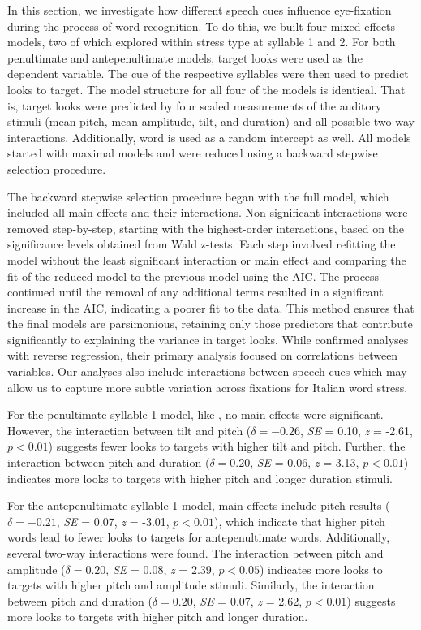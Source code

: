 In this section, we investigate how different speech cues influence eye-fixation during the process of word recognition. To do this, we built four mixed-effects models, two of which explored within stress type at syllable 1 and 2. For both penultimate and antepenultimate models, target looks were used as the dependent variable. The cue of the respective syllables were then used to predict looks to target. The model structure for all four of the models is identical. That is, target looks were predicted by four scaled measurements of the auditory stimuli (mean pitch, mean amplitude, tilt, and duration) and all possible two-way interactions. Additionally, word is used as a random intercept as well. All models started with maximal models and were reduced using a backward stepwise selection procedure. 

The backward stepwise selection procedure began with the full model, which included all main effects and their interactions. Non-significant interactions were removed step-by-step, starting with the highest-order interactions, based on the significance levels obtained from Wald z-tests. Each step involved refitting the model without the least significant interaction or main effect and comparing the fit of the reduced model to the previous model using the AIC. The process continued until the removal of any additional terms resulted in a significant increase in the AIC, indicating a poorer fit to the data. This method ensures that the final models are parsimonious, retaining only those predictors that contribute significantly to explaining the variance in target looks. While \cite{Sulpizio_McQueen_2012} confirmed analyses with reverse regression, their primary analysis focused on correlations between variables. Our analyses also include interactions between speech cues which may allow us to capture more subtle variation across fixations for Italian word stress.

For the penultimate syllable 1 model, like \cite{Sulpizio_McQueen_2012}, no main effects were significant. However, the interaction between tilt and pitch ($\delta = -0.26$, \textit{SE} = 0.10, \textit{z} = -2.61, $p < 0.01$) suggests fewer looks to targets with higher tilt and pitch. Further, the interaction between pitch and duration ($\delta = 0.20$, \textit{SE} = 0.06, \textit{z} = 3.13, $p < 0.01$) indicates more looks to targets with higher pitch and longer duration stimuli.

For the antepenultimate syllable 1 model, main effects include pitch results ($\delta = -0.21$, \textit{SE} = 0.07, \textit{z} = -3.01, $p < 0.01$), which indicate that higher pitch words lead to fewer looks to targets for antepenultimate words. Additionally, several two-way interactions were found. The interaction between pitch and amplitude ($\delta = 0.20$, \textit{SE} = 0.08, \textit{z} = 2.39, $p < 0.05$) indicates more looks to targets with higher pitch and amplitude stimuli. Similarly, the interaction between pitch and duration ($\delta = 0.20$, \textit{SE} = 0.07, \textit{z} = 2.62, $p < 0.01$) suggests more looks to targets with higher pitch and longer duration. 

